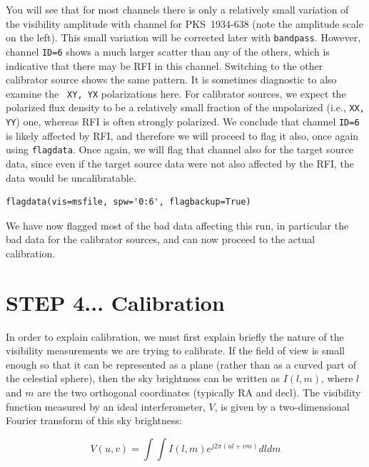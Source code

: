 \documentclass[force,almostfull,justified]{tufte-book}
\begin{document}
You will see that for most channels there is only a relatively small variation of the visibility
amplitude with channel for PKS~1934-638 (note the amplitude scale on the left).  This small variation
will be corrected later with {\tt bandpass}.  However, channel {\tt ID=6} shows a much larger scatter
than any of the others, which is indicative that there may be RFI in this channel.  Switching to the
other calibrator source shows the same pattern.  It is sometimes diagnostic to also examine the {\tt
XY, YX} polarizations here.  For calibrator sources, we expect the polarized flux density to be a
relatively small fraction of the unpolarized (i.e., {\tt XX, YY}) one, whereas RFI is often strongly
polarized. We conclude that channel {\tt ID=6} is likely affected by RFI, and therefore we will
proceed to flag it also, once again using {\tt flagdata}.  Once again, we will flag that channel also
for the target source data, since even if the target source data were not also affected by the RFI,
the data would be uncalibratable.

\begin{casacmd}
\begin{verbatim}
flagdata(vis=msfile, spw='0:6', flagbackup=True)
\end{verbatim}
\end{casacmd}

We have now flagged most of the bad data affecting this run, in particular the bad data for the
calibrator sources, and can now proceed to the actual calibration.


\section{STEP 4... Calibration}

In order to explain calibration, we must first explain briefly the nature of the visibility
measurements we are trying to calibrate.  If the field of view is small enough so that it can be
represented as a plane (rather than as a curved part of the celestial sphere), then the sky brightness
can be written as $I(l,m)$, where $l$ and $m$ are the two orthogonal coordinates (typically RA and
decl).  The visibility function measured by an ideal interferometer, $V$, is given by a
two-dimensional Fourier transform of this sky brightness:

\begin{equation}
V(u,v)=\int\int I(l,m)e^{j2\pi(ul+vm)}dl dm
\end{equation}
\end{document}
